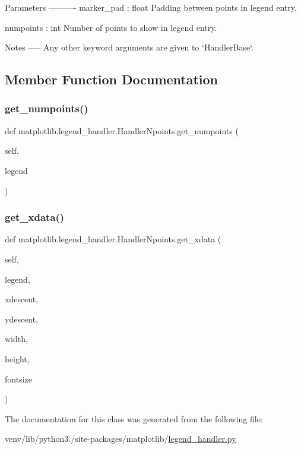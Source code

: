 \begin{DoxyVerb}Parameters
----------
marker_pad : float
    Padding between points in legend entry.

numpoints : int
    Number of points to show in legend entry.

Notes
-----
Any other keyword arguments are given to `HandlerBase`.
\end{DoxyVerb}
 

\subsection{Member Function Documentation}
\mbox{\label{classmatplotlib_1_1legend__handler_1_1HandlerNpoints_a48c3c1daffc1304cd43cad5a04a24c10}} 
\subsubsection{\texorpdfstring{get\+\_\+numpoints()}{get\_numpoints()}}
{\footnotesize\ttfamily def matplotlib.\+legend\+\_\+handler.\+Handler\+Npoints.\+get\+\_\+numpoints (\begin{DoxyParamCaption}\item[{}]{self,  }\item[{}]{legend }\end{DoxyParamCaption})}

\mbox{\label{classmatplotlib_1_1legend__handler_1_1HandlerNpoints_a7f0416f6dfc68c7209467ce4a30ec5ef}} 
\subsubsection{\texorpdfstring{get\+\_\+xdata()}{get\_xdata()}}
{\footnotesize\ttfamily def matplotlib.\+legend\+\_\+handler.\+Handler\+Npoints.\+get\+\_\+xdata (\begin{DoxyParamCaption}\item[{}]{self,  }\item[{}]{legend,  }\item[{}]{xdescent,  }\item[{}]{ydescent,  }\item[{}]{width,  }\item[{}]{height,  }\item[{}]{fontsize }\end{DoxyParamCaption})}



The documentation for this class was generated from the following file\+:\begin{DoxyCompactItemize}
\item 
venv/lib/python3./site-\/packages/matplotlib/\hyperlink{legend__handler_8py}{legend\+\_\+handler.\+py}\end{DoxyCompactItemize}

